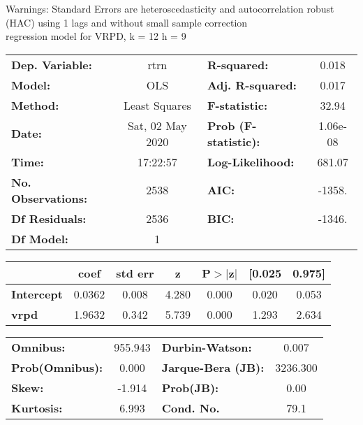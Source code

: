 Warnings: \newline
 [1] Standard Errors are heteroscedasticity and autocorrelation robust (HAC) using 1 lags and without small sample correction\\ 

regression model for VRPD, k = 12 h = 9\begin{center}
\begin{tabular}{lclc}
\toprule
\textbf{Dep. Variable:}    &       rtrn       & \textbf{  R-squared:         } &     0.018   \\
\textbf{Model:}            &       OLS        & \textbf{  Adj. R-squared:    } &     0.017   \\
\textbf{Method:}           &  Least Squares   & \textbf{  F-statistic:       } &     32.94   \\
\textbf{Date:}             & Sat, 02 May 2020 & \textbf{  Prob (F-statistic):} &  1.06e-08   \\
\textbf{Time:}             &     17:22:57     & \textbf{  Log-Likelihood:    } &    681.07   \\
\textbf{No. Observations:} &        2538      & \textbf{  AIC:               } &    -1358.   \\
\textbf{Df Residuals:}     &        2536      & \textbf{  BIC:               } &    -1346.   \\
\textbf{Df Model:}         &           1      & \textbf{                     } &             \\
\bottomrule
\end{tabular}
\begin{tabular}{lcccccc}
                   & \textbf{coef} & \textbf{std err} & \textbf{z} & \textbf{P$> |$z$|$} & \textbf{[0.025} & \textbf{0.975]}  \\
\midrule
\textbf{Intercept} &       0.0362  &        0.008     &     4.280  &         0.000        &        0.020    &        0.053     \\
\textbf{vrpd}      &       1.9632  &        0.342     &     5.739  &         0.000        &        1.293    &        2.634     \\
\bottomrule
\end{tabular}
\begin{tabular}{lclc}
\textbf{Omnibus:}       & 955.943 & \textbf{  Durbin-Watson:     } &    0.007  \\
\textbf{Prob(Omnibus):} &   0.000 & \textbf{  Jarque-Bera (JB):  } & 3236.300  \\
\textbf{Skew:}          &  -1.914 & \textbf{  Prob(JB):          } &     0.00  \\
\textbf{Kurtosis:}      &   6.993 & \textbf{  Cond. No.          } &     79.1  \\
\bottomrule
\end{tabular}
\end{center}

